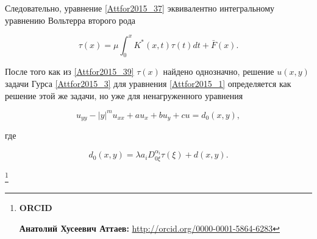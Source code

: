 Следовательно, уравнение \eqref{Attfor2015_37} эквивалентно интегральному  уравнению Вольтерра второго рода

\begin{equation}

\label{Attfor2015_39}

\tau(x)=\mu \int _0^x K^*(x,t)\tau(t)dt+\bar{F}(x).

\end{equation}



После того как из \eqref{Attfor2015_39} $\tau(x)$ найдено однозначно,  решение $u(x,y)$ задачи Гурса \eqref{Attfor2015_3} для уравнения  \eqref{Attfor2015_1} определяется как решение этой же задачи, но уже для ненагруженного уравнения

$$

u_{yy}-|y|^m u_{xx}+a u_x+b u_y+c u=d_0(x,y),

$$ 

где

$$

d_0(x,y)=\lambda a_i D_{0\xi}^{\alpha_i} \tau(\xi)+d(x,y).

$$





\thanks{{\bf ORCID}

{



{\bf Анатолий Хусеевич Аттаев:} \url{http://orcid.org/0000-0001-5864-6283}

}

}



\pagebreak



\RusRef



